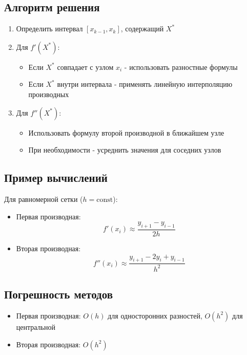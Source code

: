 \subsection*{Алгоритм решения}

\begin{enumerate}
\item Определить интервал $[x_{k-1}, x_k]$, содержащий $X^*$
\item Для $f'(X^*)$:
\begin{itemize}
\item Если $X^*$ совпадает с узлом $x_i$ - использовать разностные формулы
\item Если $X^*$ внутри интервала - применять линейную интерполяцию производных
\end{itemize}

\item Для $f''(X^*)$:
\begin{itemize}
\item Использовать формулу второй производной в ближайшем узле
\item При необходимости - усреднить значения для соседних узлов
\end{itemize}
\end{enumerate}

\subsection*{Пример вычислений}

Для равномерной сетки ($h = \text{const}$):

\begin{itemize}
\item Первая производная:
\[ f'(x_i) \approx \frac{y_{i+1} - y_{i-1}}{2h} \]

\item Вторая производная:
\[ f''(x_i) \approx \frac{y_{i+1} - 2y_i + y_{i-1}}{h^2} \]
\end{itemize}

\subsection*{Погрешность методов}

\begin{itemize}
\item Первая производная: $O(h)$ для односторонних разностей, $O(h^2)$ для центральной
\item Вторая производная: $O(h^2)$
\end{itemize}

